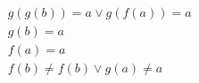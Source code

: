 \begin{align*}
%
& g(g(b)) = a \lor g(f(a)) = a
~\\~
& g(b) = a
~\\~
& f(a) = a
~\\~
& f(b)  \neq  f(b) \lor g(a)  \neq  a
%
\end{align*}
